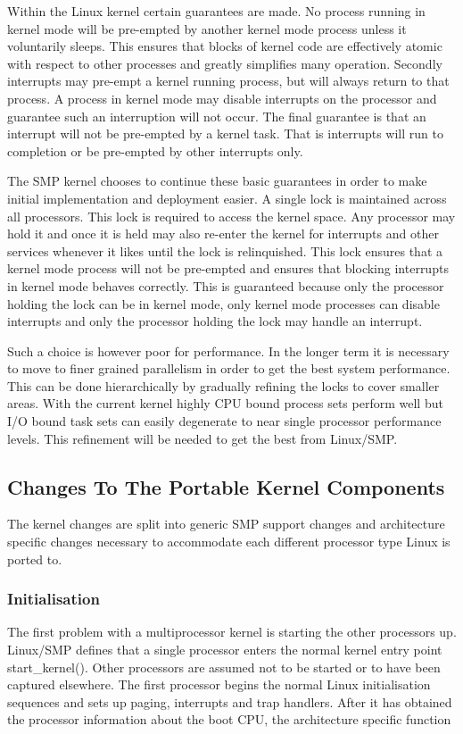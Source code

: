 \documentclass[]{article}
\begin{document}
Within the Linux kernel certain guarantees are made. No process running in 
kernel mode will be pre-empted by another kernel mode process unless it 
voluntarily sleeps.  This ensures that blocks of kernel code are 
effectively atomic with respect to other processes and greatly simplifies 
many operation. Secondly interrupts may pre-empt a kernel running process, 
but will always return to that process. A process in kernel mode may 
disable interrupts on the processor and guarantee such an interruption will 
not occur. The final guarantee is that an interrupt will not be pre-empted 
by a kernel task. That is interrupts will run to completion or be 
pre-empted by other interrupts only.

The SMP kernel chooses to continue these basic guarantees in order to make 
initial implementation and deployment easier.  A single lock is maintained 
across all processors. This lock is required to access the kernel space. 
Any processor may hold it and once it is held may also re-enter the kernel 
for interrupts and other services whenever it likes until the lock is 
relinquished. This lock ensures that a kernel mode process will not be 
pre-empted and ensures that blocking interrupts in kernel mode behaves 
correctly. This is guaranteed because only the processor holding the lock 
can be in kernel mode, only kernel mode processes can disable interrupts 
and only the processor holding the lock may handle an interrupt.

Such a choice is however poor for performance. In the longer term it is 
necessary to move to finer grained parallelism in order to get the best 
system performance. This can be done hierarchically by gradually refining 
the locks to cover smaller areas. With the current kernel highly CPU bound 
process sets perform well but I/O bound task sets can easily degenerate to 
near single processor performance levels. This refinement will be needed to 
get the best from Linux/SMP.

\subsection{Changes To The Portable Kernel Components}
The kernel changes are split into generic SMP support changes and 
architecture specific changes necessary to accommodate each different 
processor type Linux is ported to.


\subsubsection{Initialisation}
The first problem with a multiprocessor kernel is starting the other 
processors up. Linux/SMP defines that a single processor enters the normal 
kernel entry point start\_kernel(). Other processors are assumed not to be 
started or to have been captured elsewhere. The first processor begins the 
normal Linux initialisation sequences and sets up paging, interrupts and 
trap handlers. After it has obtained the processor information about the 
boot CPU, the architecture specific function 
\end{document}
